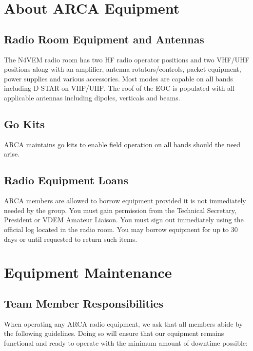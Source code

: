 \documentclass[pdflatex,letterpaper,twoside,12pt]{book}
\begin{document}
\section{About ARCA Equipment}

\subsection{Radio Room Equipment and Antennas}

The N4VEM radio room has two HF radio operator positions and two VHF/UHF positions along with an amplifier, antenna rotators/controls, packet equipment, power supplies and various accessories. Most modes are capable on all bands including D-STAR on VHF/UHF.  The roof of the EOC is populated with all applicable antennas including dipoles, verticals and beams.

\subsection{Go Kits}

ARCA maintains go kits to enable field operation on all bands should the need arise.

\subsection{Radio Equipment Loans}

ARCA members are allowed to borrow equipment provided it is not immediately needed by the group. You must gain permission from the Technical Secretary, President or VDEM Amateur Liaison.  You must sign out immediately using the official log located in the radio room. You may borrow equipment for up to 30 days or until requested to return such items.


\section{Equipment Maintenance}

\subsection{Team Member Responsibilities}

When operating any ARCA radio equipment, we ask that all members abide by the following guidelines.  Doing so will ensure that our equipment remains functional and ready to operate with the minimum amount of downtime possible:
\end{document}
